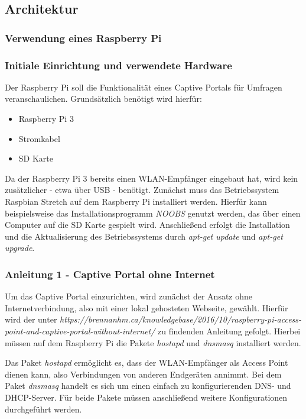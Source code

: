 \subsection{Architektur}
\subsubsection{Verwendung eines Raspberry Pi}
\subsubsection*{Initiale Einrichtung und verwendete Hardware}
Der Raspberry Pi soll die Funktionalität eines Captive Portals für Umfragen veranschaulichen. Grundsätzlich benötigt wird hierfür:
\begin{itemize}
\item Raspberry Pi 3
\item Stromkabel
\item SD Karte
\end{itemize}

Da der Raspberry Pi 3 bereits einen WLAN-Empfänger eingebaut hat, wird kein zusätzlicher - etwa über USB - benötigt. Zunächst muss das Betriebssystem Raspbian Stretch auf dem Raspberry Pi  installiert werden. Hierfür kann beispielsweise das Installationsprogramm \textit{NOOBS} genutzt werden, das über einen Computer auf die SD Karte gespielt wird. Anschließend erfolgt die Installation und die Aktualisierung des Betriebssystems durch \textit{apt-get update} und \textit{apt-get upgrade}.

\subsubsection*{Anleitung 1 - Captive Portal ohne Internet}
Um das Captive Portal einzurichten, wird zunächst der Ansatz ohne Internetverbindung, also mit einer lokal gehosteten Webseite, gewählt. Hierfür wird der unter \textit{https://brennanhm.ca/knowledgebase/2016/10/raspberry-pi-access-point-and-captive-portal-without-internet/} zu findenden Anleitung gefolgt. Hierbei müssen auf dem Raspberry Pi die Pakete \textit{hostapd} und \textit{dnsmasq} installiert werden.

Das Paket \textit{hostapd} ermöglicht es, dass der WLAN-Empfänger als Access Point dienen kann, also Verbindungen von anderen Endgeräten annimmt. Bei dem Paket \textit{dnsmasq} handelt es sich um einen einfach zu konfigurierenden DNS- und DHCP-Server. Für beide Pakete müssen anschließend weitere Konfigurationen durchgeführt werden.

